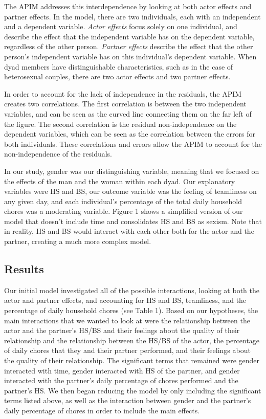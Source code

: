 \documentclass[
  man]{apa6}
\begin{document}
The APIM addresses this interdependence by looking at both actor effects and partner effects. In the model, there are two individuals, each with an independent and a dependent variable. \emph{Actor effects} focus solely on one individual, and describe the effect that the independent variable has on the dependent variable, regardless of the other person. \emph{Partner effects} describe the effect that the other person's independent variable has on this individual's dependent variable. When dyad members have distinguishable characteristics, such as in the case of heterosexual couples, there are two actor effects and two partner effects.

In order to account for the lack of independence in the residuals, the APIM creates two correlations. The first correlation is between the two independent variables, and can be seen as the curved line connecting them on the far left of the figure. The second correlation is the residual non-independence on the dependent variables, which can be seen as the correlation between the errors for both individuals. These correlations and errors allow the APIM to account for the non-independence of the residuals.

In our study, gender was our distinguishing variable, meaning that we focused on the effects of the man and the woman within each dyad. Our explanatory variables were HS and BS, our outcome variable was the feeling of teamliness on any given day, and each individual's percentage of the total daily household chores was a moderating variable. Figure 1 shows a simplified version of our model that doesn't include time and consolidates HS and BS as sexism. Note that in reality, HS and BS would interact with each other both for the actor and the partner, creating a much more complex model.

\hypertarget{results-1}{%
\subsection{Results}\label{results-1}}

Our initial model investigated all of the possible interactions, looking at both the actor and partner effects, and accounting for HS and BS, teamliness, and the percentage of daily household chores (see Table 1). Based on our hypotheses, the main interactions that we wanted to look at were the relationship between the actor and the partner's HS/BS and their feelings about the quality of their relationship and the relationship between the HS/BS of the actor, the percentage of daily chores that they and their partner performed, and their feelings about the quality of their relationship. The significant terms that remained were gender interacted with time, gender interacted with HS of the partner, and gender interacted with the partner's daily percentage of chores performed and the partner's HS. We then began reducing the model by only including the significant terms listed above, as well as the interaction between gender and the partner's daily percentage of chores in order to include the main effects.
\end{document}
